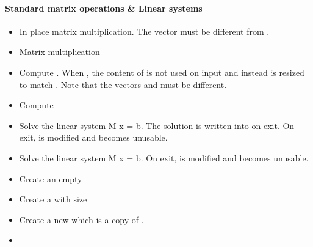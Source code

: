 \paragraph{Standard matrix operations \& Linear systems}
\begin{itemize}
  \item {}
    \sshortdescribe In place matrix multiplication. The vector  must be
    different from .
  \item {}
    \sshortdescribe Matrix multiplication  
  \item {} 
    \sshortdescribe Compute . When , the
    content of  is not used on input and instead  is resized to
    match . Note that the vectors  and  must be different.
  \item {}
    \sshortdescribe Compute 
  \item {}
    \sshortdescribe Solve the linear system M x = b. The solution is written into
     on exit. On exit,  is modified and becomes unusable.
  \item {}
    \sshortdescribe Solve the linear system M x = b. On exit,  is modified and becomes unusable.
  \item {}
    \sshortdescribe Create an empty \PnlTridiagMatLU
  \item {}
    \sshortdescribe Create a \PnlTridiagMatLU with size 
  \item {}
    \sshortdescribe Create a new \PnlTridiagMatLU which is a copy of
    .
  \item {}

\end{itemize}
